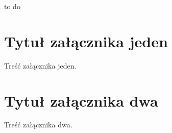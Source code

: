 \documentclass[openright]{xmgr}
\begin{document}
\summary
to do

\appendix
\chapter{Tytuł załącznika jeden}

Treść załącznika jeden.

\chapter{Tytuł załącznika dwa}

Treść załącznika dwa.

\listoffigures

\lstlistoflistings
{}%

\oswiadczenie
\end{document}
